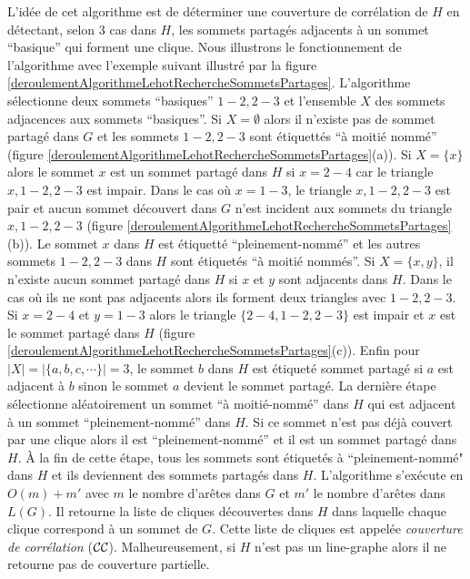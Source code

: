 L'id\'ee de cet algorithme est de d\'eterminer une couverture de corr\'elation de $H$ en d\'etectant, selon $3$ cas \cite{decompositionEnCliquesParArcs} dans $H$, 
les sommets partag\'es adjacents \`a un sommet ``basique'' qui forment une clique.
Nous illustrons le fonctionnement de l'algorithme avec l'exemple suivant illustr\'e par la figure \ref{deroulementAlgorithmeLehotRechercheSommetsPartages}.
L'algorithme s\'electionne deux sommets ``basiques''  $1-2, 2-3$ et  l'ensemble $X$ des sommets adjacences aux sommets ``basiques''.
Si $X = \emptyset$ alors il n'existe pas de sommet partag\'e dans  $G$ et les sommets $1-2, 2-3$ sont \'etiquett\'es ``\`a moiti\'e nomm\'e'' (figure \ref{deroulementAlgorithmeLehotRechercheSommetsPartages}(a)).
Si $X=\{x\}$ alors le sommet $x$ est un sommet partag\'e dans  $H$ si $x = 2-4$ car le triangle $x, 1-2, 2-3$ est impair. Dans le cas o\`u $x = 1-3$, le  triangle $x, 1-2, 2-3$ est pair et
aucun sommet d\'ecouvert dans $G$ n'est incident aux sommets du triangle $x, 1-2, 2-3$ (figure \ref{deroulementAlgorithmeLehotRechercheSommetsPartages}(b)). 
Le sommet $x$ dans $H$ est \'etiquett\'e ``pleinement-nomm\'e'' et les autres sommets $1-2, 2-3$ dans $H$ sont \'etiquet\'es ``\`a moiti\'e nomm\'es''.
Si $X=\{x,y\}$, il n'existe  aucun sommet partag\'e dans  $H$ si $x$ et $y$ sont adjacents dans $H$. Dans le cas o\`u  ils ne sont pas adjacents alors ils forment deux triangles avec $1-2, 2-3$. Si $x=2-4$ et $y=1-3$ alors le triangle $\{2-4,1-2, 2-3\}$ est impair et $x$ est le sommet partag\'e dans $H$
(figure \ref{deroulementAlgorithmeLehotRechercheSommetsPartages}(c)).
Enfin pour $|X| = |\{a,b,c, \cdots\}| = 3$, le sommet $b$ dans $H$ est \'etiquet\'e sommet partag\'e si $a$ est adjacent \`a $b$ sinon le sommet $a$ devient le sommet partag\'e.
La derni\`ere \'etape s\'electionne al\'eatoirement un sommet ``\`a moiti\'e-nomm\'e'' dans $H$ qui est adjacent \`a un sommet  ``pleinement-nomm\'e'' dans $H$. Si ce sommet n'est pas d\'ej\`a couvert par une clique alors il est ``pleinement-nomm\'e'' et il est un sommet partag\'e dans $H$. 
\`A la fin de cette \'etape, tous les sommets sont \'etiquet\'es \`a ``pleinement-nomm\'e"  dans $H$ et ils deviennent des sommets partag\'es dans $H$.
\newline
L'algorithme s'ex\'ecute  en $O(m)+m'$ avec $m$  le nombre d'ar\^etes dans $G$ et $m'$ le nombre d'ar\^etes dans $L(G)$. Il retourne la liste de cliques d\'ecouvertes dans $H$ dans laquelle chaque clique correspond  \`a un sommet de $G$. Cette liste de cliques est appel\'ee {\em couverture de corr\'elation} (${\cal CC}$).
Malheureusement, si $H$ n'est pas un line-graphe alors il ne retourne pas de couverture partielle.

